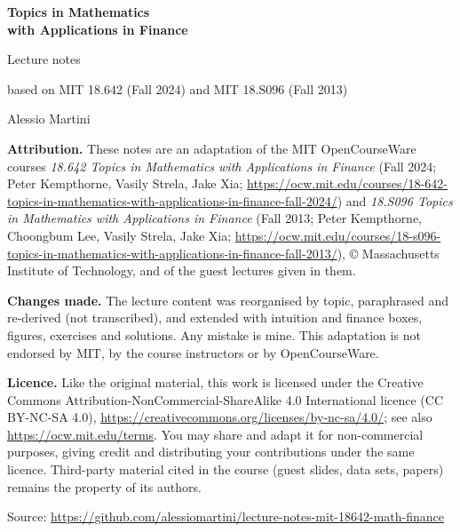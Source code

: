 \ifdefined\publicmode\documentclass[11pt,oneside,openany]{book}\else\documentclass[12pt,oneside,openany]{book}\fi
\begin{document}
\frontmatter
\ifdefined\publicmode
\begin{titlepage}
  \centering
  \vspace*{2cm}
  {\Huge\bfseries Topics in Mathematics\\[4pt] with Applications in Finance\par}
  \vspace{1cm}
  {\Large Lecture notes\par}
  \vspace{0.5cm}
  {\large based on MIT 18.642 (Fall 2024) and MIT 18.S096 (Fall 2013)\par}
  \vspace{1.5cm}
  {\large Alessio Martini\par}
  \vfill
  \begin{minipage}{0.92\textwidth}\small
    \textbf{Attribution.} These notes are an adaptation of the MIT OpenCourseWare courses
    \emph{18.642 Topics in Mathematics with Applications in Finance} (Fall 2024; Peter Kempthorne,
    Vasily Strela, Jake Xia; \url{https://ocw.mit.edu/courses/18-642-topics-in-mathematics-with-applications-in-finance-fall-2024/})
    and \emph{18.S096 Topics in Mathematics with Applications in Finance} (Fall 2013; Peter Kempthorne,
    Choongbum Lee, Vasily Strela, Jake Xia; \url{https://ocw.mit.edu/courses/18-s096-topics-in-mathematics-with-applications-in-finance-fall-2013/}),
    \copyright{} Massachusetts Institute of Technology, and of the guest lectures given in them.
    \smallskip

    \textbf{Changes made.} The lecture content was reorganised by topic, paraphrased and re-derived (not
    transcribed), and extended with intuition and finance boxes, figures, exercises and solutions. Any mistake
    is mine. This adaptation is not endorsed by MIT, by the course instructors or by OpenCourseWare.
    \smallskip

    \textbf{Licence.} Like the original material, this work is licensed under the Creative Commons
    Attribution-NonCommercial-ShareAlike 4.0 International licence (CC BY-NC-SA 4.0),
    \url{https://creativecommons.org/licenses/by-nc-sa/4.0/}; see also \url{https://ocw.mit.edu/terms}.
    You may share and adapt it for non-commercial purposes, giving credit and distributing your
    contributions under the same licence. Third-party material cited in the course (guest slides, data
    sets, papers) remains the property of its authors.
    \smallskip

    Source: \url{https://github.com/alessiomartini/lecture-notes-mit-18642-math-finance}
  \end{minipage}
  \vspace{1cm}
\end{titlepage}
\end{document}
